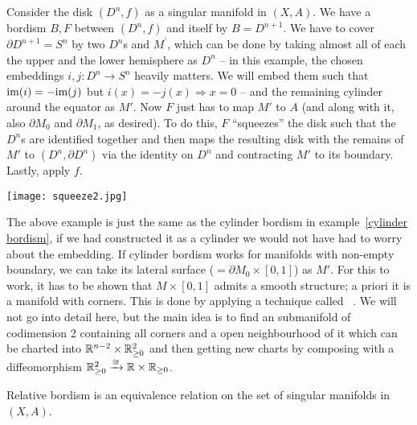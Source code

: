 \documentclass[a4paper,12pt]{article}
\begin{document}
\begin{example}\label{pokeball}
    Consider the disk \((D^n,f)\) as a singular manifold in \((X,A)\). 
    We have a bordism \(B,F\) between \((D^n,f)\) and itself by \(B=D^{n+1}\). We have to cover \(\partial D^{n+1}=S^n\) by two \(D^n\)s and \(M^\prime\), which can be done by taking almost all of each the upper and the lower hemisphere as \(D^n\) --  
    in this example, the chosen embeddings \(i,j:D^n\to S^n\) heavily matters. We will embed them such that \(\mathrm{im}(i)=-\mathrm{im}(j)\) but \(i(x)=-j(x)\Rightarrow x=0\) --
    and the remaining cylinder around the equator as \(M'\). 
    Now \(F\) just has to map \(M'\) to \(A\) (and along with it, also \(\partial M_0\) and \(\partial M_1\), as desired). 
    To do this, \(F\) \enquote{squeezes} the disk such that the \(D^n\)s are identified together and then maps the resulting disk with the remains of \(M'\) to \((D^n,\partial D^n)\) via the identity on \(D^n\) and contracting \(M'\) to its boundary. Lastly, apply \(f\).
    \begin{center}
        \texttt{[image: squeeze2.jpg]}
    \end{center}
\end{example}

\begin{remark}
    The above example is just the same as the cylinder bordism in example\ \ref{cylinder bordism}, if we had constructed it as a cylinder we would not have had to worry about the embedding. If cylinder bordism works for manifolds with non-empty boundary, we can take its lateral surface (\(=\partial M_0\times [0,1]\)) as \(M'\). For this to work, it has to be shown that \(M\times[0,1]\) admits a smooth structure; a priori it is a manifold with corners. This is done by applying a technique called \ \cite[I.3]{conner}. We will not go into detail here, but the main idea is to find an submanifold of codimension 2 containing all corners and a open neighbourhood of it which can be charted into \(\mathbb{R}^{n-2}\times\mathbb{R}_{\geq0}^2\) and then getting new charts by composing with a diffeomorphism \(\mathbb{R}_{\geq0}^2\xrightarrow\cong\mathbb{R}\times\mathbb{R}_{\geq0}\).
\end{remark}

\begin{theorem}
    Relative bordism is an equivalence relation on the set of singular manifolds in \((X,A)\).
\end{theorem}
\end{document}
